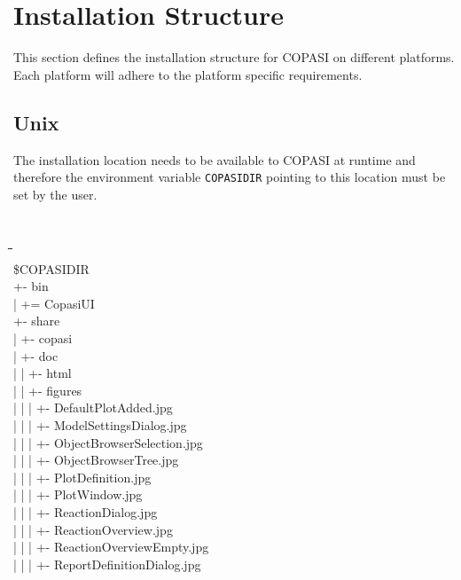 \documentclass[12pt]{book}
\begin{document}
\chapter{Installation Structure}
This section defines the installation structure for COPASI on
different platforms. Each platform will adhere to the platform
specific requirements. 

\section{Unix}
The installation location needs to be available to COPASI at runtime
and therefore the environment variable {\tt COPASIDIR} pointing to this
location must be set by the user. 
{\tt \scriptsize
\begin{tabbing}
 \hspace{4 pt}\=\hspace{17 pt}\=\hspace{17 pt}\=\hspace{17
 pt}\=\hspace{17 pt}\=\hspace{17 pt}\= \\ [-12 pt]
 \$COPASIDIR \\
 \> +- bin \\
 \> | \> += CopasiUI \\
 \> +- share \\
 \> | \> +- copasi \\
 \> | \> \> +- doc \\
 \> | \> \> | \> +- html \\
 \> | \> \> | \> \> +- figures \\
 \> | \> \> | \> \> | \> +- DefaultPlotAdded.jpg \\
 \> | \> \> | \> \> | \> +- ModelSettingsDialog.jpg \\
 \> | \> \> | \> \> | \> +- ObjectBrowserSelection.jpg \\
 \> | \> \> | \> \> | \> +- ObjectBrowserTree.jpg \\
 \> | \> \> | \> \> | \> +- PlotDefinition.jpg \\
 \> | \> \> | \> \> | \> +- PlotWindow.jpg \\
 \> | \> \> | \> \> | \> +- ReactionDialog.jpg \\
 \> | \> \> | \> \> | \> +- ReactionOverview.jpg \\
 \> | \> \> | \> \> | \> +- ReactionOverviewEmpty.jpg \\
 \> | \> \> | \> \> | \> +- ReportDefinitionDialog.jpg \\

\end{tabbing}}
\end{document}
